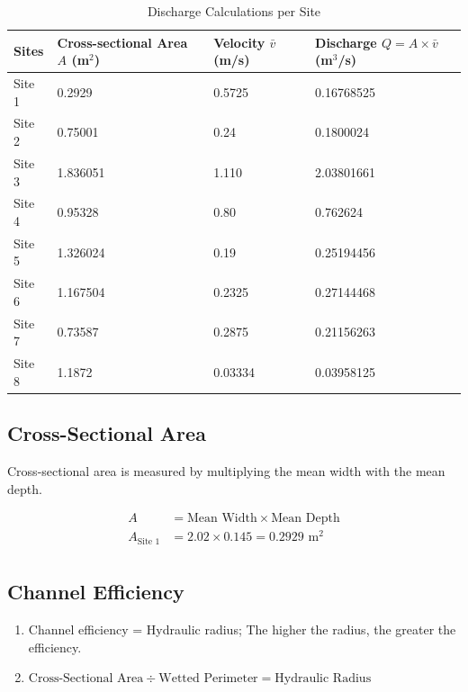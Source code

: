 \begin{table}[H]
	\centering
	\begin{tabularx}{\textwidth}{l *{3}{Y}}
		\hline
		Sites & Cross-sectional Area $A$ (m$^2$) & Velocity $\bar{v}$ (m/s) & Discharge $Q=A \times \bar{v}$ (m$^3$/s) \\
		\hline
		Site 1 & 0.2929  & 0.5725  & 0.16768525 \\
		Site 2 & 0.75001 & 0.24    & 0.1800024 \\
		Site 3 & 1.836051 & 1.110   & 2.03801661 \\
		Site 4 & 0.95328 & 0.80    & 0.762624 \\
		Site 5 & 1.326024 & 0.19    & 0.25194456 \\
		Site 6 & 1.167504 & 0.2325  & 0.27144468 \\
		Site 7 & 0.73587 & 0.2875  & 0.21156263 \\
		Site 8 & 1.1872 & 0.03334 & 0.03958125 \\
		\hline
	\end{tabularx}
	\caption{Discharge Calculations per Site}
	\label{tab:discharge_raw}
\end{table}

\subsection{Cross-Sectional Area}

Cross-sectional area is measured by multiplying the mean width with the mean depth.

\begin{align*}
	A &= \text{Mean Width} \times \text{Mean Depth} \\
	A_{\text{Site 1}} &= 2.02 \times 0.145 = 0.2929 \text{ m$^2$} \\
\end{align*}



\subsection{Channel Efficiency}


\begin{enumerate}
	\item Channel efficiency = Hydraulic radius; The higher the radius, the greater the efficiency.
	\item $\text{Cross-Sectional Area}\div\text{Wetted Perimeter} = \text{Hydraulic Radius}$
\end{enumerate}


